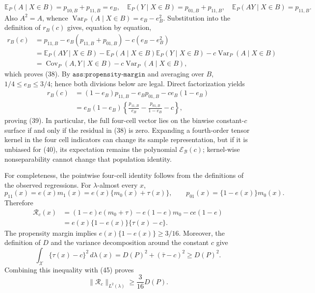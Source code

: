 \[
 \mathbb E_P(A\mid X\in B)=p_{10,B}+p_{11,B}=e_B,
 \quad
 \mathbb E_P(Y\mid X\in B)=p_{01,B}+p_{11,B},
 \quad
 \mathbb E_P(AY\mid X\in B)=p_{11,B}.                                                  \tag{42}
\]
Also \(A^2=A\), whence \(\operatorname{Var}_P(A\mid X\in B)=e_B-e_B^2\).  Substitution into the definition of \(r_B(c)\) gives, equation by equation,
\[
 \begin{aligned}
 r_B(c)
 &=p_{11,B}-e_B(p_{11,B}+p_{01,B})-c(e_B-e_B^2)\\
 &=\mathbb E_P(AY\mid X\in B)
   -\mathbb E_P(A\mid X\in B)\mathbb E_P(Y\mid X\in B)
   -c\operatorname{Var}_P(A\mid X\in B)\\
 &=\operatorname{Cov}_P(A,Y\mid X\in B)
   -c\operatorname{Var}_P(A\mid X\in B),
 \end{aligned}                                                                         \tag{43}
\]
which proves (38).  By \(\texttt{ass:propensity-margin}\) and averaging over \(B\), \(1/4\le e_B\le3/4\); hence both divisions below are legal.  Direct factorization yields
\[
 \begin{aligned}
 r_B(c)
 &=(1-e_B)p_{11,B}-e_Bp_{01,B}-c e_B(1-e_B)\\
 &=e_B(1-e_B)
 \left\{\frac{p_{11,B}}{e_B}-\frac{p_{01,B}}{1-e_B}-c\right\},
 \end{aligned}                                                                         \tag{44}
\]
proving (39).  In particular, the full four-cell vector lies on the binwise constant-\(c\) surface if and only if the residual in (38) is zero.  Expanding a fourth-order tensor kernel in the four cell indicators can change its sample representation, but if it is unbiased for (40), its expectation remains the polynomial \(\mathcal E_{\mathcal B}(c)\); kernel-wise nonseparability cannot change that population identity.

For completeness, the pointwise four-cell identity follows from the definitions of the observed regressions.  For \(\lambda\)-almost every \(x\),
\[
 p_{11}(x)=e(x)m_1(x)=e(x)\{m_0(x)+\tau(x)\},
 \qquad
 p_{01}(x)=\{1-e(x)\}m_0(x).
\]
Therefore
\[
 \begin{aligned}
 \mathcal R_c(x)
 &=(1-e)e(m_0+\tau)-e(1-e)m_0-ce(1-e)\\
 &=e(x)\{1-e(x)\}\{\tau(x)-c\}.                                                        \tag{45}
 \end{aligned}
\]
The propensity margin implies \(e(x)\{1-e(x)\}\ge3/16\).  Moreover, the definition of \(D\) and the variance decomposition around the constant \(c\) give
\[
 \int_{\mathcal X}\{\tau(x)-c\}^2\,d\lambda(x)
 =D(P)^2+(\bar\tau-c)^2\ge D(P)^2.
\]
Combining this inequality with (45) proves
\[
 \|\mathcal R_c\|_{L^2(\lambda)}\ge\frac3{16}D(P).                                    \tag{46}
\]

